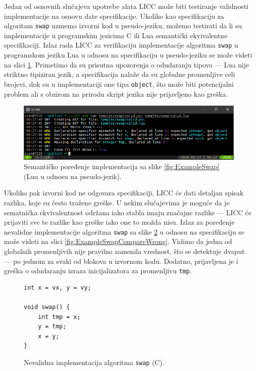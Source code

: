 Jedan od osnovnih slučajeva upotrebe alata LICC može biti testiranje validnosti implementacije na osnovu date specifikacije. Ukoliko kao specifikaciju za algoritam \texttt{swap} uzmemo izvorni kod u pseudo-jeziku, možemo testirati da li su implementacije u programskim jezicima C ili Lua semantički ekvivalentne specifikaciji. Izlaz rada LICC za verifikaciju implementacije algoritma \texttt{swap} u programskom jeziku Lua u odnosu na specifikaciju u pseudo-jeziku se može videti na slici \ref{fig:ExampleSwapCompareValid}. Primetimo da su prisutna upozorenja o odudaranju tipova --- Lua nije striktno tipiziran jezik, a specifikacija nalaže da su globalne promenljive celi brojevi, dok su u implementaciji one tipa \texttt{object}, što može biti potencijalni problem ali s obzirom na prirodu skript jezika nije prijavljeno kao greška.

\begin{figure}[h!]
\centering
\includegraphics[scale=0.65]{images/eval/cmp_valid.png}
\caption{Semantičko poređenje implementacija sa slike \ref{fig:ExampleSwap} (Lua u odnosu na pseudo-jezik).}
\label{fig:ExampleSwapCompareValid}
\end{figure}

Ukoliko pak izvorni kod ne odgovara specifikaciji, LICC će dati detaljan spisak razlika, koje su često tražene greške. U nekim slučajevima je moguće da je sematnička ekvivalentnost održana iako stabla imaju značajne razlike --- LICC će prijaviti sve te razlike kao greške iako one to možda nisu. Izlaz za poređenje nevalidne implementacije algoritma \texttt{swap} sa slike \ref{fig:ExampleSwapWrong} u odnosu na specifikaciju se može videti na slici \ref{fig:ExampleSwapCompareWrong}. Vidimo da jedna od globalnih promenljivih nije pravilno zamenila vrednost, što se detektuje dvaput --- po jednom za svaki od blokova u izvornom kodu. Dodatno, prijavljena je i greška o odudaranju izraza inicijalizatora za promenljivu \texttt{tmp}.

\begin{figure}[h!]
\begin{lstlisting}
int x = vx, y = vy;

void swap() {
    int tmp = x;
    y = tmp;
    x = y;
}
\end{lstlisting}
\caption{Nevalidna implementacija algoritma \texttt{swap} (C).}
\label{fig:ExampleSwapWrong}
\end{figure}

